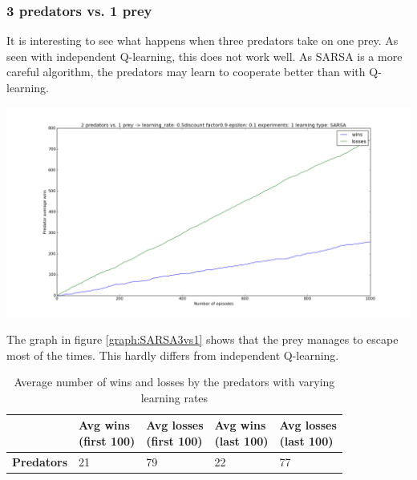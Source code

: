 \subsubsection{3 predators vs. 1 prey}
It is interesting to see what happens when three predators take on one prey. As seen with independent Q-learning, this does not work well. As SARSA is a more careful algorithm, the predators may learn to cooperate better than with Q-learning.

\begin{center}
	\includegraphics[scale=0.3]{3_predators_SARSA}
	\label{graph:SARSA3vs1}
\end{center}


The graph in figure \ref{graph:SARSA3vs1} shows that the prey manages to escape most of the times. \: This hardly differs from independent Q-learning.

\begin{table}[H]
\begin{center}
\begin{tabular}{| l | l | l | l | l |}
\hline
 & \parbox{2cm}{\textbf{Avg wins \\ (first 100)}} & \parbox{2cm}{\textbf{Avg losses \\ (first 100)}} & \parbox{2cm}{\textbf{Avg wins \\ (last 100)}} & \parbox{2cm}{\textbf{Avg losses \\ (last 100)}} \\
\hline
\textbf{Predators} & 21 & 79 & 22 & 77 \\
\hline
\end{tabular}
\caption{Average number of wins and losses by the predators with varying learning rates}
\end{center}
\end{table}

